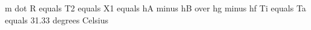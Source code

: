 m dot R equals T2 equals  
X1 equals hA minus hB over hg minus hf  
Ti equals Ta equals 31.33 degrees Celsius